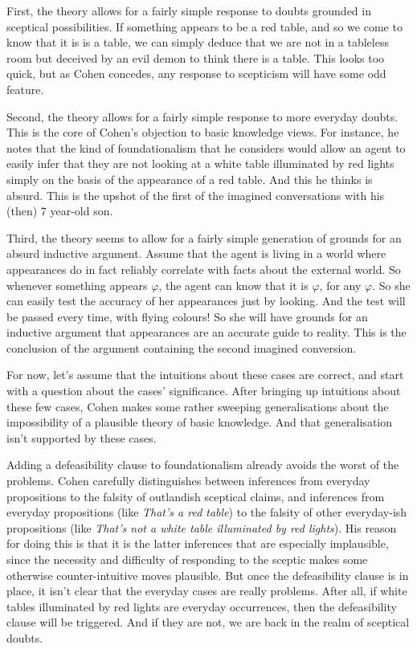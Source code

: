 First, the theory allows for a fairly simple response to doubts grounded in sceptical possibilities. If something appears to be a red table, and so we come to know that it is is a table, we can simply deduce that we are not in a tableless room but deceived by an evil demon to think there is a table. This looks too quick, but as Cohen concedes, any response to scepticism will have some odd feature.

Second, the theory allows for a fairly simple response to more everyday doubts. This is the core of Cohen's objection to basic knowledge views. For instance, he notes that the kind of foundationalism that he considers would allow an agent to easily infer that they are not looking at a white table illuminated by red lights simply on the basis of the appearance of a red table. And this he thinks is absurd. This is the upshot of the first of the imagined conversations with his (then) 7 year-old son.

Third, the theory seems to allow for a fairly simple generation of grounds for an absurd inductive argument. Assume that the agent is living in a world where appearances do in fact reliably correlate with facts about the external world. So whenever something appears $\varphi$, the agent can know that it is $\varphi$, for any $\varphi$. So she can easily test the accuracy of her appearances just by looking. And the test will be passed every time, with flying colours! So she will have grounds for an inductive argument that appearances are an accurate guide to reality. This is the conclusion of the argument containing the second imagined conversion.

For now, let's assume that the intuitions about these cases are correct, and start with a question about the cases' significance. After bringing up intuitions about these few cases, Cohen makes some rather sweeping generalisations about the impossibility of a plausible theory of basic knowledge. And that generalisation isn't supported by these cases.

Adding a defeasibility clause to foundationalism already avoids the worst of the problems. Cohen carefully distinguishes between inferences from everyday propositions to the falsity of outlandish sceptical claims, and inferences from everyday propositions (like \emph{That's a red table}) to the falsity of other everyday-ish propositions (like \emph{That's not a white table illuminated by red lights}). His reason for doing this is that it is the latter inferences that are especially implausible, since the necessity and difficulty of responding to the sceptic makes some otherwise counter-intuitive moves plausible. But once the defeasibility clause is in place, it isn't clear that the everyday cases are really problems. After all, if white tables illuminated by red lights are everyday occurrences, then the defeasibility clause will be triggered. And if they are not, we are back in the realm of sceptical doubts.

